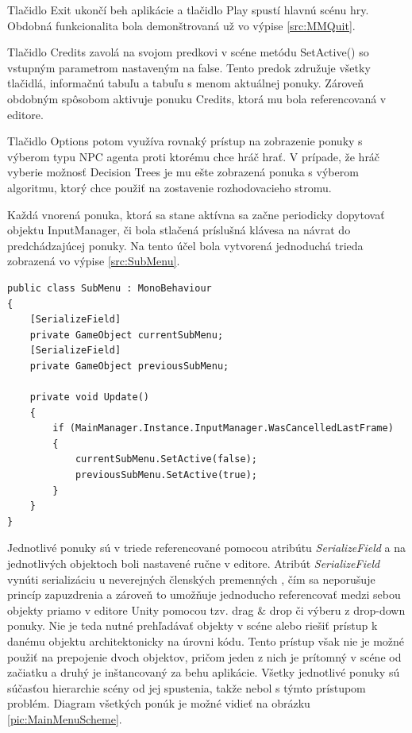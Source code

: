 \documentclass[slovak, master]{diploma}
\begin{document}
Tlačidlo Exit ukončí beh aplikácie a tlačidlo Play spustí hlavnú scénu hry. Obdobná funkcionalita bola demonštrovaná už vo výpise \ref{src:MMQuit}.

Tlačidlo Credits zavolá na svojom predkovi v scéne metódu SetActive() so vstupným parametrom nastaveným na false. Tento predok združuje všetky tlačidlá, informačnú tabuľu a tabuľu s menom aktuálnej ponuky. Zároveň obdobným spôsobom aktivuje ponuku Credits, ktorá mu bola referencovaná v editore. 

Tlačidlo Options potom využíva rovnaký prístup na zobrazenie ponuky s výberom typu NPC agenta proti ktorému chce hráč hrať. V prípade, že hráč vyberie možnosť Decision Trees je mu ešte zobrazená ponuka s výberom algoritmu, ktorý chce použiť na zostavenie rozhodovacieho stromu.

Každá vnorená ponuka, ktorá sa stane aktívna sa začne periodicky dopytovať objektu InputManager, či bola stlačená príslušná klávesa na návrat do predchádzajúcej ponuky. Na tento účel bola vytvorená jednoduchá trieda zobrazená vo výpise \ref{src:SubMenu}.

\vspace{8pt}
\begin{lstlisting}[label=src:SubMenu,caption={Trieda SubMenu reprezentujúca vnorenú ponuku}]
public class SubMenu : MonoBehaviour
{
    [SerializeField]
    private GameObject currentSubMenu;
    [SerializeField]
    private GameObject previousSubMenu;

    private void Update()
    {
        if (MainManager.Instance.InputManager.WasCancelledLastFrame)
        {
            currentSubMenu.SetActive(false);
            previousSubMenu.SetActive(true);
        }
    }
}
\end{lstlisting}

Jednotlivé ponuky sú v triede referencované pomocou atribútu \textit{SerializeField} a na jednotlivých objektoch boli nastavené ručne v editore. Atribút \textit{SerializeField} vynúti serializáciu u neverejných členských premenných \cite{SerializeField}, čím sa neporušuje princíp zapuzdrenia a zároveň to umožňuje jednoducho referencovať medzi sebou objekty priamo v editore Unity pomocou tzv. drag \& drop či výberu z drop-down ponuky. Nie je teda nutné prehľadávať objekty v scéne alebo riešiť prístup k danému objektu architektonicky na úrovni kódu. Tento prístup však nie je možné použiť na prepojenie dvoch objektov, pričom jeden z nich je prítomný v scéne od začiatku a druhý je inštancovaný za behu aplikácie. Všetky jednotlivé ponuky sú súčasťou hierarchie scény od jej spustenia, takže nebol s týmto prístupom problém. Diagram všetkých ponúk je možné vidieť na obrázku \ref{pic:MainMenuScheme}.
\end{document}

